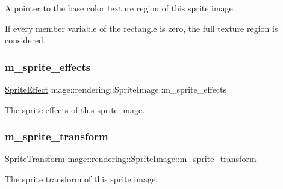 A pointer to the base color texture region of this sprite image.

If every member variable of the rectangle is zero, the full texture region is considered. \hypertarget{classmage_1_1rendering_1_1_sprite_image_a25891d2cfd1edd3dc86c0bc82700cad2}{}\label{classmage_1_1rendering_1_1_sprite_image_a25891d2cfd1edd3dc86c0bc82700cad2} 
\subsubsection{\texorpdfstring{m\+\_\+sprite\+\_\+effects}{m\_sprite\_effects}}
{\footnotesize\ttfamily \hyperlink{namespacemage_1_1rendering_a4dbc3536c87b906f1d41d863ec458e78}{Sprite\+Effect} mage\+::rendering\+::\+Sprite\+Image\+::m\+\_\+sprite\+\_\+effects\hspace{0.3cm}{\ttfamily [private]}}

The sprite effects of this sprite image. \hypertarget{classmage_1_1rendering_1_1_sprite_image_a7985369471809a6efcdeb8a265510b7a}{}\label{classmage_1_1rendering_1_1_sprite_image_a7985369471809a6efcdeb8a265510b7a} 
\subsubsection{\texorpdfstring{m\+\_\+sprite\+\_\+transform}{m\_sprite\_transform}}
{\footnotesize\ttfamily \hyperlink{classmage_1_1_sprite_transform}{Sprite\+Transform} mage\+::rendering\+::\+Sprite\+Image\+::m\+\_\+sprite\+\_\+transform\hspace{0.3cm}{\ttfamily [private]}}

The sprite transform of this sprite image. 